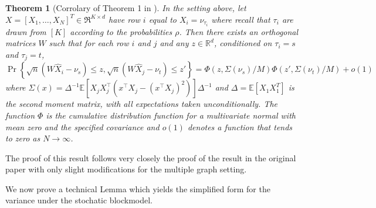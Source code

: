 \documentclass[10pt,letterpaper]{article}
\newtheorem{theorem}[fact]{Theorem}
\newcommand{\Ex}{\mathbb{E}}
\begin{document}
\begin{theorem}[Corrolary of Theorem 1 in \citet{athreya2013limit}]\label{thm:clt_ext}
  In the setting above, let $X=[X_1,\dotsc,X_N]^T\in\Re^{K\times d}$ have row $i$ equal to $X_i=\nu_{\tau_i}$ where recall that $\tau_i$ are drawn from $[K]$ according to the probabilities $\rho$.
	Then there exists an  orthogonal matrices $W$ such that for each row $i$ and $j$ and any $z \in \mathbb{R}^{d}$, conditioned on $\tau_i=s$ and $\tau_j=t$,
  \begin{equation}
    \label{eq:4}
    \Pr\left\{\sqrt{n}( W \hat{X}_i - \nu_s ) \leq z, \sqrt{n}( W \hat{X}_j - \nu_t) \leq z'\right\}
=  \Phi(z, \Sigma(\nu_s)/M)  \Phi(z', \Sigma(\nu_t)/M) +o(1)
  \end{equation}
  where $\Sigma(x) =\Delta^{-1}\Ex[ X_j X_j^\top(x^\top X_j -(x^\top
  X_j)^2)]\Delta^{-1}$ and $\Delta=\Ex[ X_1 X_{1}^{T}]$ is the second
  moment matrix, with all expectations taken unconditionally.
  The function $\Phi$ is the cumulative distribution function for a multivariate normal with mean zero and the specified covariance and $o(1)$ denotes a function that tends to zero as $N\to \infty$.
\end{theorem}
The proof of this result follows very closely the proof of the result in the original paper with only slight modifications for the multiple graph setting.

We now prove a technical Lemma which yields the simplified form for the variance under the stochatic blockmodel.
\end{document}
